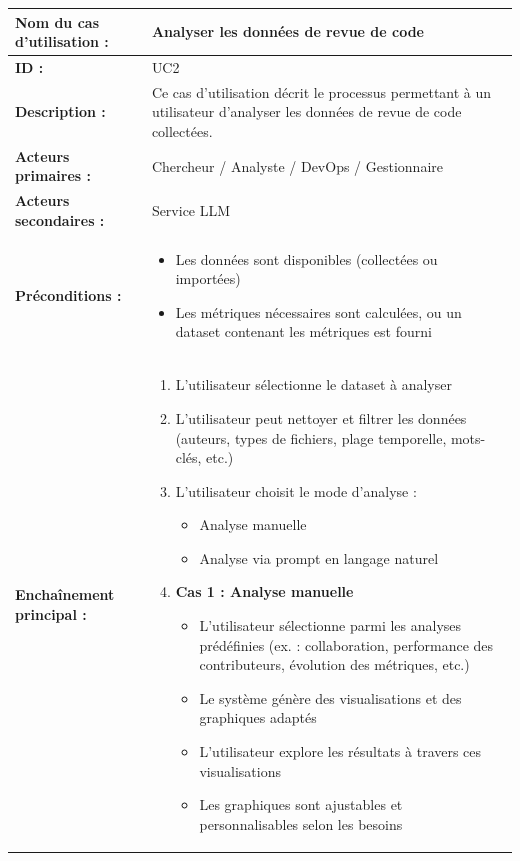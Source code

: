 \begin{tabularx}{\textwidth}{|l|X|}
\hline

\textbf{Nom du cas d’utilisation :} & Analyser les données de revue de code \\ \hline
\textbf{ID :} & UC2 \\ \hline

\textbf{Description :} & 
Ce cas d’utilisation décrit le processus permettant à un utilisateur d’analyser les données de revue de code collectées. \\ \hline

\textbf{Acteurs primaires :} & Chercheur / Analyste / DevOps / Gestionnaire \\ \hline
\textbf{Acteurs secondaires :} & Service LLM \\ \hline

\textbf{Préconditions :} & 
\begin{itemize}
    \item Les données sont disponibles (collectées ou importées)
    \item Les métriques nécessaires sont calculées, ou un dataset contenant les métriques est fourni
\end{itemize} \\ \hline

\textbf{Enchaînement principal :} & 
\begin{enumerate}
    \item L’utilisateur sélectionne le dataset à analyser
    \item L’utilisateur peut nettoyer et filtrer les données (auteurs, types de fichiers, plage temporelle, mots-clés, etc.)
    \item L’utilisateur choisit le mode d’analyse :
    \begin{itemize}
        \item Analyse manuelle
        \item Analyse via prompt en langage naturel
    \end{itemize}

    \item \textbf{Cas 1 : Analyse manuelle}
    \begin{itemize}
        \item L’utilisateur sélectionne parmi les analyses prédéfinies (ex. : collaboration, performance des contributeurs, évolution des métriques, etc.)
        \item Le système génère des visualisations et des graphiques adaptés
        \item L’utilisateur explore les résultats à travers ces visualisations
        \item Les graphiques sont ajustables et personnalisables selon les besoins
    \end{itemize}


\end{enumerate}
\end{tabularx}
